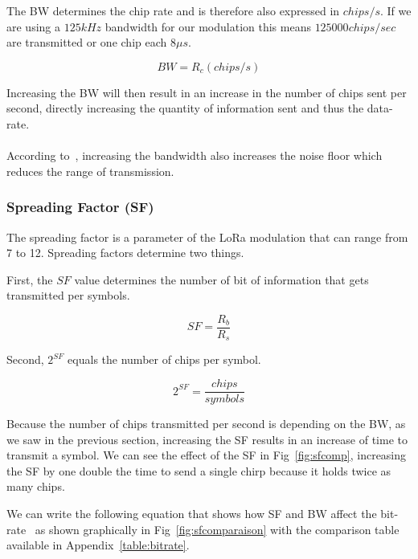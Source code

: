 The BW determines the chip rate and is therefore also expressed in $chips/s$.
 If we are using a $125 kHz$ bandwidth
for our modulation this means $125000 chips / sec$ are transmitted or one chip
each $8 \mu s$.

\begin{equation}
  BW = R_c (chips/s)
\end{equation}

Increasing the BW will then result in an increase in the number of chips sent
per second, directly increasing the quantity of information sent and thus the
data-rate.

\paragraph{}

According to~\cite{semtech:modulationbasics}, increasing the
bandwidth also increases the noise floor which reduces the range of transmission.

\subsubsection{Spreading Factor (SF)}

The spreading factor is a parameter of the LoRa modulation that can range from 7 to 12.
Spreading factors determine two things.

First, the $SF$ value determines the number of bit of information that gets transmitted
per symbols.

\begin{equation}
 \label{eq:sf1}
  SF = \frac{R_b}{R_s}
\end{equation}

Second, $2^{SF}$ equals the number of chips per symbol.

\begin{equation}
 \label{eq:sf2}
  2^{SF} = \frac{chips}{symbols}
\end{equation}

Because the number of chips transmitted per second is depending on the BW,
as we saw in the previous section, increasing the SF results in an increase of
time to transmit a symbol.
We can see the effect of the SF in Fig~\ref{fig:sfcomp},
increasing the SF by one double the time to send a single chirp because it holds
twice as many chips.

We can write the following equation that shows how SF and BW affect the
bit-rate~\cite{semtech:modemdesign} as shown graphically in Fig~\ref{fig:sfcomparaison}
with the comparison table available in Appendix~\ref{table:bitrate}.

